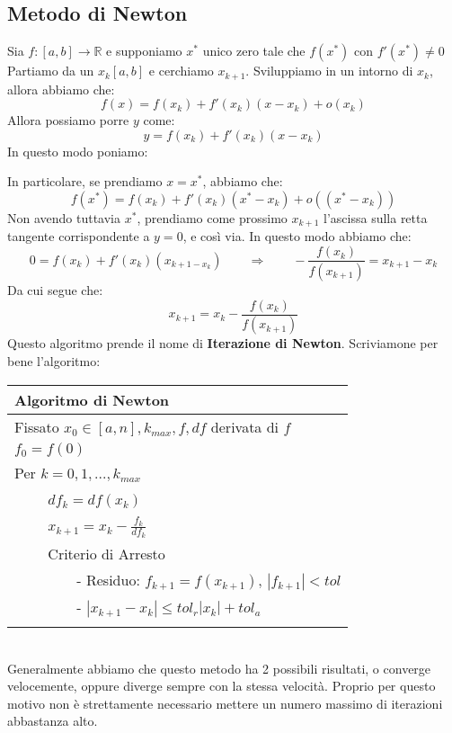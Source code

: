 \documentclass[11pt,a4paper,twoside]{article}
\theoremstyle{definition}
\begin{document}
\subsection{Metodo di Newton}

Sia $f:[a,b] \to \mathbb R$ e supponiamo $x^*$ unico zero tale che $f(x^*)$ con $f'(x^*)\neq 0$ Partiamo da un $x_k[a,b]$ e cerchiamo $x_{k+1}$. Sviluppiamo in un intorno di $x_k$, allora abbiamo che:
\[ f(x) = f(x_k) + f'(x_k)(x-x_k) + o(x_k) \]
Allora possiamo porre $y$ come:
\[ y = f(x_k) + f'(x_k)(x-x_k) \]
In questo modo poniamo:
\begin{center}
\end{center}
In particolare, se prendiamo $x = x^*$, abbiamo che:
\[ f(x^*) = f(x_k) + f'(x_k)(x^*-x_k) + o((x^*-x_k)) \]
Non avendo tuttavia $x^*$, prendiamo come prossimo $x_{k+1}$ l'ascissa sulla retta tangente corrispondente a $y = 0$, e così via. In questo modo abbiamo che:
\[ 0 = f(x_k) + f'(x_k)(x_{k+1 - x_k}) \qquad \Rightarrow \qquad -\frac{f(x_k)}{f(x_{k+1})} = x_{k+1} - x_k \]
Da cui segue che:
\[ x_{k+1} = x_k - \frac{f(x_k)}{f(x_{k+1})} \]
Questo algoritmo prende il nome di \textbf{Iterazione di Newton}. Scriviamone per bene l'algoritmo:

\begin{tabular}{l}
	\\
	\textbf{Algoritmo di Newton}\\
	\hline
	Fissato $x_0 \in [a,n], k_{max}, f, df$ derivata di $f$\\
	$f_0 = f(0)$\\
	Per $k = 0,1,...,k_{max}$\\
	$\qquad$ $df_k = df(x_k)$\\
	$\qquad$ $x_{k+1} = x_k -\frac{f_k}{df_k}$\\
	$\qquad$ Criterio di Arresto\\
	$\qquad \qquad$ - Residuo: $f_{k+1} = f(x_{k+1})$, $|f_{k+1}|<tol$\\
	$\qquad \qquad$ - $|x_{k+1} - x_k|\leq tol_r|x_k| + tol_a$\\
	\\
\end{tabular}\\
Generalmente abbiamo che questo metodo ha 2 possibili risultati, o converge velocemente, oppure diverge sempre con la stessa velocità. Proprio per questo motivo non è strettamente necessario mettere un numero massimo di iterazioni abbastanza alto.
\end{document}
